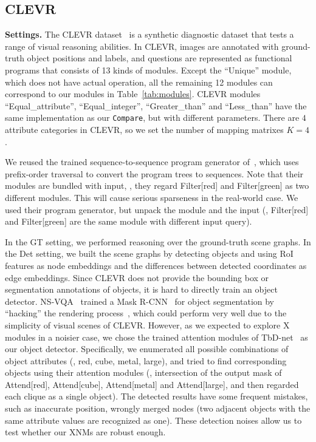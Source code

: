 \documentclass[10pt,twocolumn,letterpaper]{article}
\begin{document}
\subsection{CLEVR}
\vspace{-0.1cm}

\textbf{Settings.}
The CLEVR dataset~\cite{johnson2017clevr} is a synthetic diagnostic dataset that tests a range of visual reasoning abilities.
In CLEVR, images are annotated with ground-truth object positions and labels, and questions are represented as functional programs that consists of 13 kinds of modules.
Except the ``Unique'' module, which does not have actual operation, all the remaining 12 modules can correspond to our modules in Table~\ref{tab:modules}.
CLEVR modules ``Equal\_attribute'', ``Equal\_integer'', ``Greater\_than'' and ``Less\_than'' have the same implementation as our \texttt{Compare}, but with different parameters.
There are $4$ attribute categories in CLEVR, so we set the number of mapping matrixes $K=4$.


We reused the trained sequence-to-sequence program generator of~\cite{johnson2017inferring,mascharka2018transparency}, which uses prefix-order traversal to convert the program trees to sequences.
Note that their modules are bundled with input, \eg, they regard Filter[red] and Filter[green] as two different modules.
This will cause serious sparseness in the real-world case.
We used their program generator, but unpack the module and the input (\eg, Filter[red] and Filter[green] are the same module with different input query).

In the GT setting, we performed reasoning over the ground-truth scene graphs.
In the Det setting, we built the scene graphs by detecting objects and using RoI features as node embeddings and the differences between detected coordinates as edge embeddings.
Since CLEVR does not provide the bounding box or segmentation annotations of objects, it is hard to directly train an object detector. NS-VQA~\cite{yi2018nsvqa} trained a Mask R-CNN~\cite{he2017mask} for object segmentation by ``hacking'' the rendering process~\cite{johnson2017clevr}, which could perform very well due to the simplicity of visual scenes of CLEVR. However, as we expected to explore X modules in a noisier case, we chose the trained attention modules of TbD-net~\cite{mascharka2018transparency} as our object detector.
Specifically, we enumerated all possible combinations of object attributes (\eg, red, cube, metal, large), and tried to find corresponding objects using their attention modules (\eg, intersection of the output mask of Attend[red], Attend[cube], Attend[metal] and Attend[large], and then regarded each clique as a single object).
The detected results have some frequent mistakes, such as inaccurate position, wrongly merged nodes (two adjacent objects with the same attribute values are recognized as one). These detection noises allow us to test whether our XNMs are robust enough.
\end{document}
